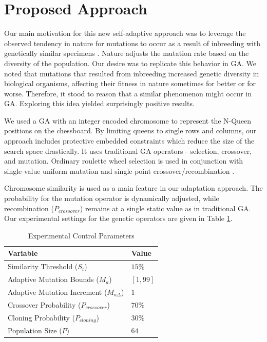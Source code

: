 \documentclass[conference]{IEEEtran}
\begin{document}
\section{Proposed Approach}
Our main motivation for this new self-adaptive approach was to leverage the observed tendency in nature for mutations to occur as a result of inbreeding with genetically similar specimens \cite{cit:17,cit:18}. Nature adjusts the mutation rate based on the diversity of the population. Our desire was to replicate this behavior in GA. We noted that mutations that resulted from inbreeding increased genetic diversity in biological organisms, affecting their fitness in nature sometimes for better or for worse. Therefore, it stood to reason that a similar phenomenon might occur in GA. Exploring this idea yielded surprisingly positive results.

We used a GA with an integer encoded chromosome to represent the N-Queen positions on the chessboard. By limiting queens to single rows and columns, our approach includes protective embedded constraints which reduce the size of the search space drastically. It uses traditional GA operators - selection, crossover, and mutation. Ordinary roulette wheel selection \cite{cit:19} is used in conjunction with single-value uniform mutation and single-point crossover/recombination \cite{cit:16}. 

Chromosome similarity is used as a main feature in our adaptation approach. The probability for the mutation operator is dynamically adjusted, while recombination ($P_{crossover}$) remains at a single static value as in traditional GA. Our experimental settings for the genetic operators are given in Table \ref{table:geneticoperators}.

\begin{table}
\centering
\caption{Experimental Control Parameters}
\begin{tabular}{|l|l|} \hline
Variable&                                     Value \\ \hline
Similarity Threshold ($S_{t}$)&               $15\%$ \\ \hline
Adaptive Mutation Bounds ($M_{a}$)&           $[1, 99]$ \\ \hline   
Adaptive Mutation Increment ($M_{a\Delta}$)&  $1$ \\ \hline
Crossover Probability ($P_{crossover}$)&      $70\%$ \\ \hline
Cloning Probability ($P_{cloning}$)&          $30\%$ \\ \hline
Population Size ($P$)&                        $64$ \\ \hline      
\end{tabular}
\label{table:geneticoperators}
\end{table}
\end{document}

